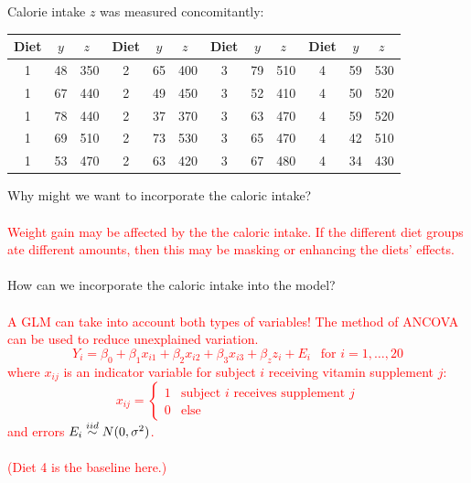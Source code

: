 Calorie intake $z$ was measured concomitantly:
\begin{center}
\begin{tabular}{ccc|ccc|ccc|ccc}
Diet & $y$ & $z\ \ $ & Diet & $y$ & $z\ \ $ &Diet & $y$ & $z\ \ $ &Diet & $y$ & $z\ \ $ \\ \hline
1 & 48 & 350 & 2 & 65 & 400 & 3 & 79 & 510 & 4 & 59 & 530 \\
1 & 67 & 440 & 2 & 49 & 450 & 3 & 52 & 410 & 4 & 50 & 520 \\
1 & 78 & 440 & 2 & 37 & 370 & 3 & 63 & 470 & 4 & 59 & 520 \\
1 & 69 & 510 & 2 & 73 & 530 & 3 & 65 & 470 & 4 & 42 & 510 \\
1 & 53 & 470 & 2 & 63 & 420 & 3 & 67 & 480 & 4 & 34 & 430 \\ \hline
\end{tabular} 
\end{center}

Why might we want to incorporate the caloric intake?%
\textcolor{red}{\\~\\
Weight gain may be affected by the the caloric intake.  If the different diet groups ate different amounts, then this may be masking or enhancing the diets' effects.}\\~\\

How can we incorporate the caloric intake into the model?%
\textcolor{red}{\\~\\
A GLM can take into account both types of variables!  The method of ANCOVA can be used to reduce unexplained variation. \\
$$ Y_i = \beta_0 + \beta_1 x_{i1} + \beta_2 x_{i2} + \beta_3 x_{i3} + \beta_z z_i + E_i \ \ \mbox{ for }i=1,\ldots,20$$
where $x_{ij}$ is an indicator variable for subject $i$ receiving vitamin supplement $j$:
$$ x_{ij}=\begin{cases} 1 & \text{subject $i$ receives supplement $j$} \\  
0 & \text{else} \end{cases}$$
and errors $E_i \stackrel{iid}{\sim} N(0,\sigma^2)$.\\~\\
(Diet 4 is the baseline here.)}\\~\\

